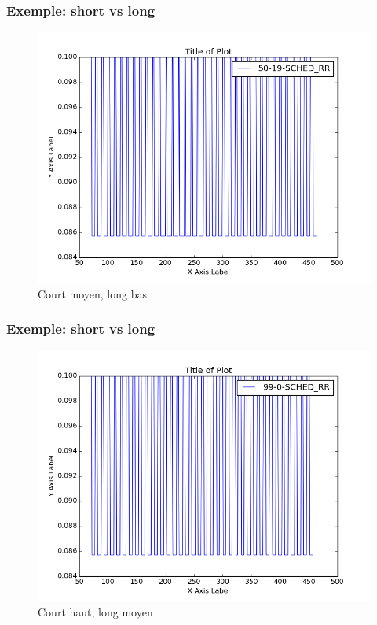 \documentclass{beamer}
\begin{document}
\begin{frame}
    \frametitle{Exemple: short vs long}

    \begin{center}
        \begin{figure}
            \includegraphics[scale=0.3]{../../short_vs_long/figures/50-19-SCHED_RR.png}
            \caption{Court moyen, long bas}
        \end{figure}
    \end{center}
\end{frame}

\begin{frame}
    \frametitle{Exemple: short vs long}

    \begin{center}
        \begin{figure}
            \includegraphics[scale=0.3]{../../short_vs_long/figures/99-0-SCHED_RR.png}
            \caption{Court haut, long moyen}
        \end{figure}
    \end{center}
\end{frame}
\end{document}
